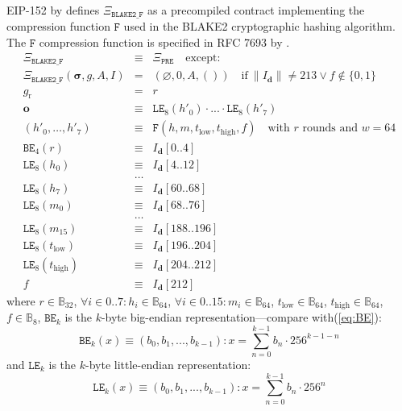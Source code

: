 \documentclass[9pt,oneside]{amsart}
\begin{document}
EIP-152 by \cite{EIP-152} defines $\Xi_{\mathtt{BLAKE2\_F}}$ as a precompiled contract implementing the compression function $\mathtt{F}$ used in the BLAKE2 cryptographic hashing algorithm.
The $\mathtt{F}$ compression function is specified in RFC 7693 by \cite{RFC-7693}.
\begin{eqnarray}
  \Xi_{\mathtt{BLAKE2\_F}}&\equiv&\Xi_{\mathtt{PRE}}\quad\text{except:}\\
  \Xi_{\mathtt{BLAKE2\_F}}(\boldsymbol\sigma,g,A,I)&=&\left(\varnothing,0,A,()\right)\quad\text{if}\ \lVert I_{\mathbf{d}}\rVert \neq 213 \vee f \notin \{0, 1\} \\
  g_{\mathrm{r}} &=& r\\
  \mathbf{o} &\equiv& \mathtt{LE}_8(h'_0)\cdot ... \cdot \mathtt{LE}_8(h'_7) \\
  (h'_0,\dots,h'_7) &\equiv& \mathtt{F}(h, m, t_\mathrm{low}, t_\mathrm{high}, f) \quad\text{with } r \text{ rounds and } w = 64 \\
  \mathtt{BE}_4(r) &\equiv& I_{\mathbf{d}}[0..4] \\
  \mathtt{LE}_8(h_0) &\equiv& I_{\mathbf{d}}[4..12] \\
  &\dots& \\
  \mathtt{LE}_8(h_7) &\equiv& I_{\mathbf{d}}[60..68] \\
  \mathtt{LE}_8(m_0) &\equiv& I_{\mathbf{d}}[68..76] \\
  &\dots& \\
  \mathtt{LE}_8(m_{15}) &\equiv& I_{\mathbf{d}}[188..196] \\
  \mathtt{LE}_8(t_\mathrm{low}) &\equiv& I_{\mathbf{d}}[196..204] \\
  \mathtt{LE}_8(t_\mathrm{high}) &\equiv& I_{\mathbf{d}}[204..212] \\
  f &\equiv& I_{\mathbf{d}}[212]
\end{eqnarray}
where $r \in \mathbb{B}_{32}$, $\forall i \in 0..7: h_i \in \mathbb{B}_{64}$, $\forall i \in 0..15: m_i \in \mathbb{B}_{64}$,
$t_\mathrm{low} \in \mathbb{B}_{64}$, $t_\mathrm{high} \in \mathbb{B}_{64}$, $f \in \mathbb{B}_8$,
$\mathtt{BE}_k$ is the $k$-byte big-endian representation---compare with(\ref{eq:BE}):
\begin{equation}
  \mathtt{BE}_k(x) \equiv (b_0, b_1, ..., b_{k-1}): x = \sum_{n = 0}^{k-1} b_n \cdot 256^{k-1-n}
\end{equation}
and $\mathtt{LE}_k$ is the $k$-byte little-endian representation:
\begin{equation}
  \mathtt{LE}_k(x) \equiv (b_0, b_1, ..., b_{k-1}): x = \sum_{n = 0}^{k-1} b_n \cdot 256^n
\end{equation}
\end{document}

